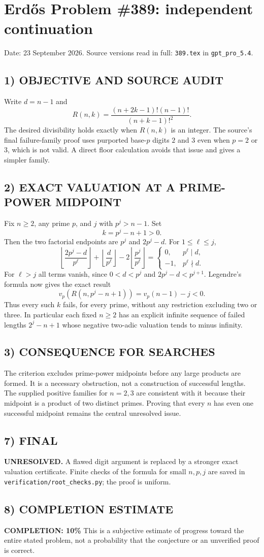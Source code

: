 \section{Erd\H{o}s Problem \#389: independent continuation}
\noindent Date: 23 September 2026. Source versions read in full: \texttt{389.tex} in \texttt{gpt\_pro\_5.4}.

\subsection*{1) OBJECTIVE AND SOURCE AUDIT}
Write $d=n-1$ and
\[
R(n,k)=\frac{(n+2k-1)!(n-1)!}{(n+k-1)!^2}.
\]
The desired divisibility holds exactly when $R(n,k)$ is an integer. The source's final failure-family proof uses purported base-$p$ digits $2$ and $3$ even when $p=2$ or $3$, which is not valid. A direct floor calculation avoids that issue and gives a simpler family.
\subsection*{2) EXACT VALUATION AT A PRIME-POWER MIDPOINT}
Fix $n\ge2$, any prime $p$, and $j$ with $p^j>n-1$. Set
\[
k=p^j-n+1>0.
\]
Then the two factorial endpoints are $p^j$ and $2p^j-d$. For $1\le\ell\le j$,
\[
\left\lfloor\frac{2p^j-d}{p^\ell}\right\rfloor+
\left\lfloor\frac d{p^\ell}\right\rfloor-
2\left\lfloor\frac{p^j}{p^\ell}\right\rfloor
=
\begin{cases}0,&p^\ell\mid d,\\-1,&p^\ell\nmid d.\end{cases}
\]
For $\ell>j$ all terms vanish, since $0<d<p^j$ and $2p^j-d<p^{j+1}$. Legendre's formula now gives the exact result
\[
\boxed{v_p(R(n,p^j-n+1))=v_p(n-1)-j<0.}
\]
Thus every such $k$ fails, for every prime, without any restriction excluding two or three. In particular each fixed $n\ge2$ has an explicit infinite sequence of failed lengths $2^j-n+1$ whose negative two-adic valuation tends to minus infinity.
\subsection*{3) CONSEQUENCE FOR SEARCHES}
The criterion excludes prime-power midpoints before any large products are formed. It is a necessary obstruction, not a construction of successful lengths. The supplied positive families for $n=2,3$ are consistent with it because their midpoint is a product of two distinct primes. Proving that every $n$ has even one successful midpoint remains the central unresolved issue.
\subsection*{7) FINAL}
\textbf{UNRESOLVED.} A flawed digit argument is replaced by a stronger exact valuation certificate. Finite checks of the formula for small $n,p,j$ are saved in \texttt{verification/root\_checks.py}; the proof is uniform.

\subsection*{8) COMPLETION ESTIMATE}
\textbf{COMPLETION: 10\%}
This is a subjective estimate of progress toward the entire stated problem, not a probability that the conjecture or an unverified proof is correct.
